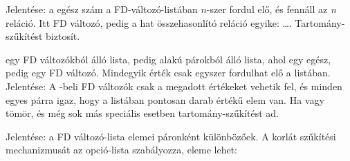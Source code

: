 \medskip

{}

Jelentése: a  egész szám a  FD-változó-listában $n$-szer fordul elő,
és fennáll az  {\it n}  reláció. Itt  FD változó,
 pedig a hat összehasonlító reláció egyike: \cd{\#=, \#\bs=, \#<} \ldots.
Tartomány-szűkítést biztosít.

\medskip

{}

 egy FD változókból álló lista,  pedig   alakú párokból
álló lista, ahol  egy egész,  pedig egy FD változó. Mindegyik 
érték csak egyszer fordulhat elő a  listában. Jelentése: A -beli
FD változók csak a megadott  értékeket vehetik fel, és minden egyes 
párra igaz, hogy a  listában pontosan  darab  értékű elem van.
Ha  vagy  tömör, és még sok más speciális esetben tartomány-szűkítést
ad.

\medskip

\label{all_distinct}
{}

Jelentése: a  FD változó-lista elemei páronként különbözőek.  
A korlát szűkítési mechanizmusát az  opció-lista szabályozza,
eleme lehet:

